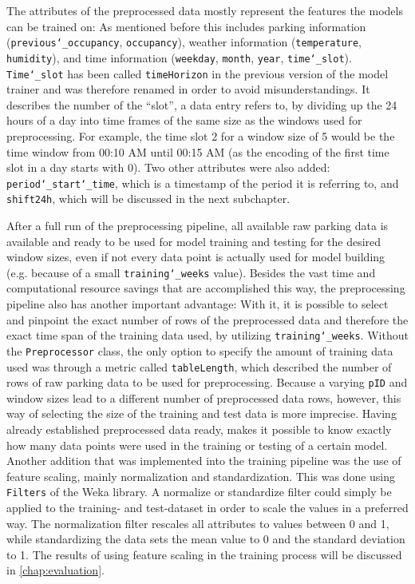 The attributes of the preprocessed data mostly represent the features the models can be trained on: As mentioned before this includes parking information (\texttt{previous\char`_occupancy}, \texttt{occupancy}), weather information (\texttt{temperature}, \texttt{humidity}), and time information (\texttt{weekday}, \texttt{month}, \texttt{year}, \texttt{time\char`_slot}). \texttt{Time\char`_slot} has been called \texttt{timeHorizon} in the previous version of the model trainer and was therefore renamed in order to avoid misunderstandings. It describes the number of the “slot”, a data entry refers to, by dividing up the 24 hours of a day into time frames of the same size as the windows used for preprocessing. For example, the time slot 2 for a window size of 5 would be the time window from 00:10 AM until 00:15 AM (as the encoding of the first time slot in a day starts with 0). Two other attributes were also added: \texttt{period\char`_start\char`_time}, which is a timestamp of the period it is referring to, and \texttt{shift24h}, which will be discussed in the next subchapter.  

After a full run of the preprocessing pipeline, all available raw parking data is available and ready to be used for model training and testing for the desired window sizes, even if not every data point is actually used for model building (e.g. because of a small \texttt{training\char`_weeks} value). Besides the vast time and computational resource savings that are accomplished this way, the preprocessing pipeline also has another important advantage: With it, it is possible to select and pinpoint the exact number of rows of the preprocessed data and therefore the exact time span of the training data used, by utilizing \texttt{training\char`_weeks}. Without the \texttt{Preprocessor} class, the only option to specify the amount of training data used was through a metric called \texttt{tableLength}, which described the number of rows of raw parking data to be used for preprocessing. Because a varying \texttt{pID} and window sizes lead to a different number of preprocessed data rows, however, this way of selecting the size of the training and test data is more imprecise. Having already established preprocessed data ready, makes it possible to know exactly how many data points were used in the training or testing of a certain model. Another addition that was implemented into the training pipeline was the use of feature scaling, mainly normalization and standardization. This was done using \texttt{Filters} of the Weka library. A normalize or standardize filter could simply be applied to the training- and test-dataset in order to scale the values in a preferred way. The normalization filter rescales all attributes to values between 0 and 1, while standardizing the data sets the mean value to 0 and the standard deviation to 1. The results of using feature scaling in the training process will be discussed in \autoref{chap:evaluation}.



